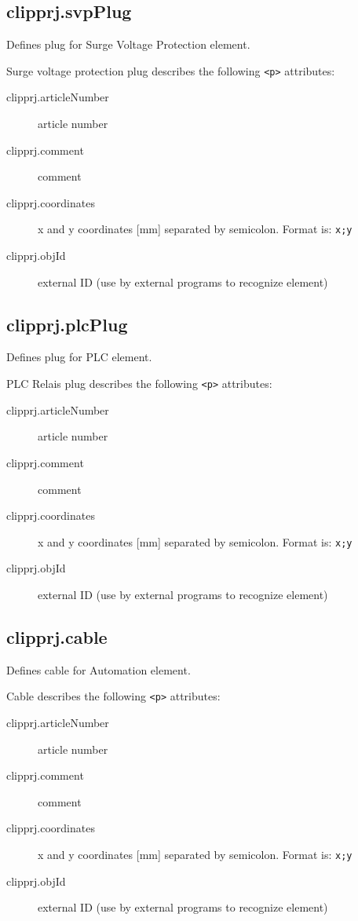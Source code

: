 \documentclass[%
	a4paper,
	oneside,
	listof=numbered,
	parskip=half,
	headsepline=true,
	footsepline=false,
	0.7headlines,
	]{scrbook}
\begin{document}
\subsection{clipprj.svpPlug}

Defines plug for Surge Voltage Protection element.

Surge voltage protection plug describes the following \verb|<p>| attributes: 

\begin{description}
	\item[clipprj.articleNumber] article number 
	\item[clipprj.comment] comment 
	\item[clipprj.coordinates] x and y coordinates [mm] separated by semicolon.
	Format is: \verb|x;y|
	\item[clipprj.objId] external ID (use by external programs to recognize element)
\end{description}

\subsection{clipprj.plcPlug}

Defines plug for PLC element.

PLC Relais plug describes the following \verb|<p>| attributes: 

\begin{description}
	\item[clipprj.articleNumber] article number 
	\item[clipprj.comment] comment 
	\item[clipprj.coordinates] x and y coordinates [mm] separated by semicolon.
	Format is: \verb|x;y|
	\item[clipprj.objId] external ID (use by external programs to recognize element)
\end{description}

\subsection{clipprj.cable}

Defines cable for Automation element.

Cable describes the following \verb|<p>| attributes: 

\begin{description}
	\item[clipprj.articleNumber] article number 
	\item[clipprj.comment] comment 
	\item[clipprj.coordinates] x and y coordinates [mm] separated by semicolon.
	Format is: \verb|x;y|
	\item[clipprj.objId] external ID (use by external programs to recognize element)
\end{description}
\end{document}
